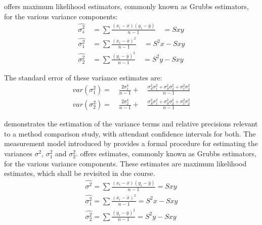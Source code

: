 \documentclass[12pt, a4paper]{report}
\theoremstyle{plain}
\theoremstyle{definition}
\theoremstyle{remark}
\begin{document}
\citet{Grubbs48} offers maximum likelihood estimators, commonly
known as Grubbs estimators, for the various variance components:
\begin{eqnarray}
\hat{\sigma^{2}_{s}} \quad= \sum{\frac{(x_{i}-\bar{x})(y_{i}-\bar{y})}{n-1}}\quad=Sxy\\
\hat{\sigma^{2}_{1}} \quad= \sum{\frac{(x_{i}-\bar{x})^{2}}{n-1}} \quad=S^{2}x-Sxy \nonumber\\
\hat{\sigma^{2}_{2}} \quad=
\sum{\frac{(y_{i}-\bar{y})^{2}}{n-1}}\quad=S^{2}y-Sxy \nonumber
\nonumber
\end{eqnarray}

The standard error of these variance estimates are:
\begin{eqnarray}
var(\sigma^{2}_{1}) =\quad \frac{2\sigma^{4}_{1}}{n-1} +\quad
\frac{\sigma^2_{S}\sigma^2_{1}+\sigma^2_{S}\sigma^2_{2}+\sigma^2_{1}\sigma^2_{2}
}{n-1}\\
var(\sigma^{2}_{2}) =\quad \frac{2\sigma^{4}_{2}}{n-1} +\quad
\frac{\sigma^2_{S}\sigma^2_{1}+\sigma^2_{S}\sigma^2_{2}+\sigma^2_{1}\sigma^2_{2}
}{n-1}\nonumber
\end{eqnarray}


\citet{Kinsella} demonstrates the estimation of the variance terms and relative precisions relevant to a method comparison study, with attendant confidence intervals for both. The measurement model introduced by \citet{Grubbs48,Grubbs73} provides a formal procedure for estimating the variances $\sigma^2$, $\sigma^2_{1}$ and $\sigma^2_{2}$. \citet{Grubbs48} offers estimates, commonly known as Grubbs estimators, for the various variance components. These estimates are maximum likelihood estimates, which shall be revisited in due course.
\begin{eqnarray*}
	\hat{\sigma^{2}} = \sum{\frac{(x_{i}-\bar{x})(y_{i}-\bar{y})}{n-1}} = Sxy\\
	\hat{\sigma^{2}_{1}} = \sum{\frac{(x_{i}-\bar{x})^{2}}{n-1}} =S^{2}x - Sxy  \\
	\hat{\sigma^{2}_{2}} =
	\sum{\frac{(y_{i}-\bar{y})^{2}}{n-1}} = S^{2}y - Sxy
\end{eqnarray*}

\end{document}
